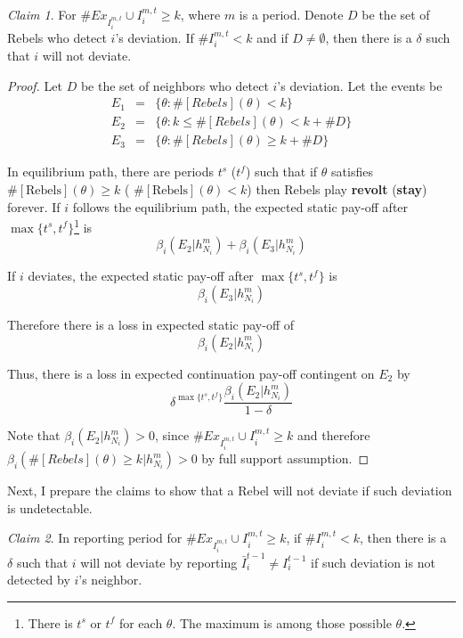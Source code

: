 \documentclass[12pt,letterpaper]{article}
\newtheorem*{main result}{Main Result}
\theoremstyle{definition}
\theoremstyle{remark}
\theoremstyle{claim}
\newtheorem{claim}{Claim}
\begin{document}
\begin{claim} 
\label{claim_detection_reporting_period}
For $\#Ex_{I^{m,t}_i}\cup I^{m,t}_i\geq k$, where $m$ is a period. Denote $D$ be the set of Rebels who detect $i$'s deviation. If $\# I^{m,t}_i<k$ and if $D\neq \emptyset$, then there is a $\delta$ such that $i$ will not deviate.
\end{claim}
\begin{proof}

Let $D$ be the set of neighbors who detect $i$'s deviation. Let the events be
\begin{eqnarray*}
E_1 	&= &\{\theta: \#[Rebels](\theta)< k\}\\
E_2 	&= &\{\theta: k\leq \#[Rebels](\theta)<k+\# D\}\\
E_3 	&= &\{\theta: \#[Rebels](\theta)\geq k+\# D\}
\end{eqnarray*}

In equilibrium path, there are periods $t^{s}$ ($t^{f}$) such that if $\theta$ satisfies $\#[\text{Rebels}](\theta)\geq k$ ( $\#[\text{Rebels}](\theta)< k$) then Rebels play \textbf{revolt} (\textbf{stay}) forever. If $i$ follows the equilibrium path, the expected static pay-off after $\max\{t^s,t^f\}$\footnote{There is $t^{s}$ or $t^{f}$ for each $\theta$. The maximum is among those possible $\theta$.} is
 \[\beta_{i}(E_2|h^{m}_{N_i})+\beta_{i}(E_3|h^{m}_{N_i})\]

If $i$ deviates, the expected static pay-off after $\max\{t^s,t^f\}$ is
 \[\beta_{i}(E_3|h^{m}_{N_i})\]
 
Therefore there is a loss in expected static pay-off of
\[\beta_{i}(E_2|h^{m}_{N_i})\]

Thus, there is a loss in expected continuation pay-off contingent on $E_2$ by
\[\delta^{\max\{t^s,t^f\}}\frac{\beta_{i}(E_2|h^{m}_{N_i})}{1-\delta}\]

Note that $\beta_{i}(E_2|h^{m}_{N_i})>0$, since $\#Ex_{I^{m,t}_i}\cup I^{m,t}_i\geq k$ and therefore $\beta_{i}(\#[Rebels](\theta)\geq k|h^{m}_{N_i})>0$ by full support assumption.
\end{proof}


Next, I prepare the claims to show that a Rebel will not deviate if such deviation is undetectable.

\begin{claim} 
\label{claim_deviation_higher_reporting}
In reporting period for $\# Ex_{I^{m,t}_i}\cup I^{m,t}_i \geq k$, if $\# I^{m,t}_i<k$, then there is a $\delta$ such that $i$ will not deviate by reporting $\bar{I}^{t-1}_i\neq I^{t-1}_i$ if such deviation is not detected by $i$'s neighbor.
\end{claim}
\end{document}
